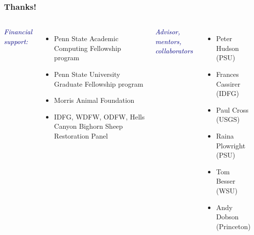 \documentclass[fleqn,xcolor=table]{beamer}
\begin{document}
{

\begin{frame}[t]
	\frametitle{\color{darkred}Thanks!}
\vspace{1.75in}

\begin{columns}[t]
\scriptsize{
\textcolor{navy}{\textit{Financial support:}}

\begin{itemize}
	\item[] \color{darkred}Penn State Academic Computing Fellowship program
	\item[] \color{darkred}Penn State University Graduate Fellowship program
	\item[] \color{darkred}Morris Animal Foundation
	\item[] \color{darkred}IDFG, WDFW, ODFW, Hells Canyon Bighorn Sheep Restoration Panel 
\end{itemize}
}
\scriptsize{
\textcolor{navy}{\textit{Advisor, mentors, collaborators}}
\begin{itemize}
	\item[] \color{darkred}Peter Hudson (PSU)
	\item[] \color{darkred}Frances Cassirer (IDFG)
	\item[] \color{darkred}Paul Cross (USGS)
	\item[] \color{darkred}Raina Plowright (PSU)
	\item[] \color{darkred}Tom Besser (WSU)
	\item[] \color{darkred}Andy Dobson (Princeton)
\end{itemize}
\vspace{.1in}
}
\end{columns}
\end{frame}
}
\end{document}
